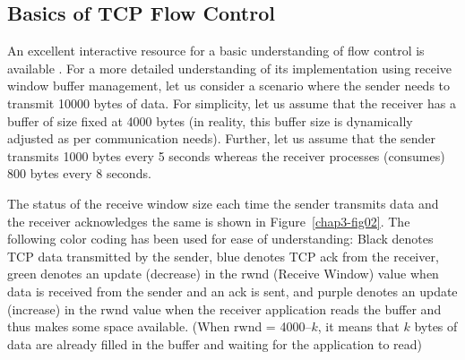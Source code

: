 \begin{multicols}{2}
\section{Basics of TCP Flow Control}

An excellent interactive resource for a basic understanding of flow control is available \cite{art3-key07}. For a more detailed understanding of its implementation using receive window buffer management, let us consider a scenario where the sender needs to transmit 10000 bytes of data. For simplicity, let us assume that the receiver has a buffer of size fixed at 4000 bytes (in reality, this buffer size is dynamically adjusted as per communication needs). Further, let us assume that the sender transmits 1000 bytes every 5 seconds whereas the receiver processes (consumes) 800 bytes every 8 seconds.

The status of the receive window size each time the sender transmits data and the receiver acknowledges the same is shown in Figure~\ref{chap3-fig02}. The following color coding has been used for ease of understanding: Black denotes TCP data transmitted by the sender, blue denotes TCP ack from the receiver, green denotes an update (decrease) in the rwnd (Receive Window) value when data is received from the sender and an ack is sent, and purple denotes an update (increase) in the rwnd value when the receiver application reads the buffer and thus makes some space available. (When rwnd = 4000–$k$, it means that $k$ bytes of data are already filled in the buffer and waiting for the application to read)


\end{multicols}
